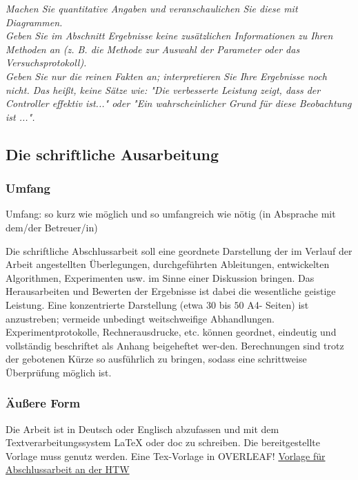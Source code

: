 
\emph{Machen Sie quantitative Angaben und veranschaulichen Sie diese mit Diagrammen. 
\\
Geben Sie im Abschnitt Ergebnisse keine zusätzlichen Informationen zu Ihren Methoden an (z. B. die Methode zur Auswahl der Parameter oder das Versuchsprotokoll). 
\\
Geben Sie nur die reinen Fakten an; interpretieren Sie Ihre Ergebnisse noch nicht. Das heißt, keine Sätze wie: "Die verbesserte Leistung zeigt, dass der Controller effektiv ist..." oder "Ein wahrscheinlicher Grund für diese Beobachtung ist ...".}



\subsection{Die schriftliche Ausarbeitung}





\subsubsection{Umfang}
Umfang: so kurz wie möglich und so umfangreich wie nötig (in Absprache mit dem/der Betreuer/in)

Die schriftliche Abschlussarbeit soll eine geordnete Darstellung der im Verlauf der Arbeit angestellten Überlegungen, durchgeführten Ableitungen, entwickelten Algorithmen, Experimenten usw. im Sinne einer Diskussion bringen. Das Herausarbeiten und Bewerten der Ergebnisse ist dabei die wesentliche geistige Leistung. Eine konzentrierte Darstellung (etwa $30$ bis $50$ A4- Seiten) ist anzustreben; vermeide unbedingt weitschweifige Abhandlungen. Experimentprotokolle, Rechnerausdrucke, etc. können geordnet, eindeutig und vollständig beschriftet als Anhang beigeheftet wer-den. Berechnungen sind trotz der gebotenen Kürze so ausführlich zu bringen, sodass eine schrittweise Überprüfung möglich ist.

\subsubsection{Äußere Form}

Die Arbeit ist in Deutsch oder Englisch abzufassen und mit dem Textverarbeitungssystem LaTeX oder doc zu schreiben. Die bereitgestellte Vorlage muss genutz werden.
Eine Tex-Vorlage in OVERLEAF!
\hyperlink{https://www.overleaf.com/project/629f45ce28c12f2c468b8f78}{
Vorlage für Abschlussarbeit an der HTW}

